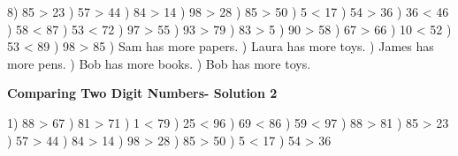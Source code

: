 \documentclass{article}%
\begin{document}
8) 85 > 23%
) 57 > 44%
) 84 > 14%
) 98 > 28%
) 85 > 50%
) 5 < 17%
) 54 > 36%
) 36 < 46%
) 58 < 87%
) 53 < 72%
) 97 > 55%
) 93 > 79%
) 83 > 5%
) 90 > 58%
) 67 > 66%
) 10 < 52%
) 53 < 89%
) 98 > 85%
) Sam has more papers.%
) Laura has more toys.%
) James has more pens.%
) Bob has more books.%
) Bob has more toys.%
\newline%
\newpage%
\large%
\begin{center}%
\textbf{Comparing Two Digit Numbers- Solution 2}%
\newline%
\end{center} \normalsize%
1) 88 > 67%
) 81 > 71%
) 1 < 79%
) 25 < 96%
) 69 < 86%
) 59 < 97%
) 88 > 81%
) 85 > 23%
) 57 > 44%
) 84 > 14%
) 98 > 28%
) 85 > 50%
) 5 < 17%
) 54 > 36%
\newline%
\end{document}
